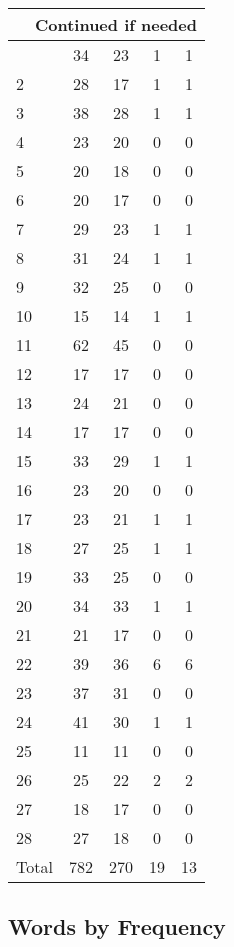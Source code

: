 \begin{center}
\begin{longtable}{l|c|c|c|c}
\hline \multicolumn{5}{|r|}{{Continued if needed}} \\ \hline
\endfoot 
1 & 34 & 23 & 1 & 1\\ \hline
2 & 28 & 17 & 1 & 1\\ \hline
3 & 38 & 28 & 1 & 1\\ \hline
4 & 23 & 20 & 0 & 0\\ \hline
5 & 20 & 18 & 0 & 0\\ \hline
6 & 20 & 17 & 0 & 0\\ \hline
7 & 29 & 23 & 1 & 1\\ \hline
8 & 31 & 24 & 1 & 1\\ \hline
9 & 32 & 25 & 0 & 0\\ \hline
10 & 15 & 14 & 1 & 1\\ \hline
11 & 62 & 45 & 0 & 0\\ \hline
12 & 17 & 17 & 0 & 0\\ \hline
13 & 24 & 21 & 0 & 0\\ \hline
14 & 17 & 17 & 0 & 0\\ \hline
15 & 33 & 29 & 1 & 1\\ \hline
16 & 23 & 20 & 0 & 0\\ \hline
17 & 23 & 21 & 1 & 1\\ \hline
18 & 27 & 25 & 1 & 1\\ \hline
19 & 33 & 25 & 0 & 0\\ \hline
20 & 34 & 33 & 1 & 1\\ \hline
21 & 21 & 17 & 0 & 0\\ \hline
22 & 39 & 36 & 6 & 6\\ \hline
23 & 37 & 31 & 0 & 0\\ \hline
24 & 41 & 30 & 1 & 1\\ \hline
25 & 11 & 11 & 0 & 0\\ \hline
26 & 25 & 22 & 2 & 2\\ \hline
27 & 18 & 17 & 0 & 0\\ \hline
28 & 27 & 18 & 0 & 0\\ \hline
\hline \hline
Total & 782 & 270 & 19 & 13



\end{longtable}
\end{center}

 
\subsection{Words by Frequency}

